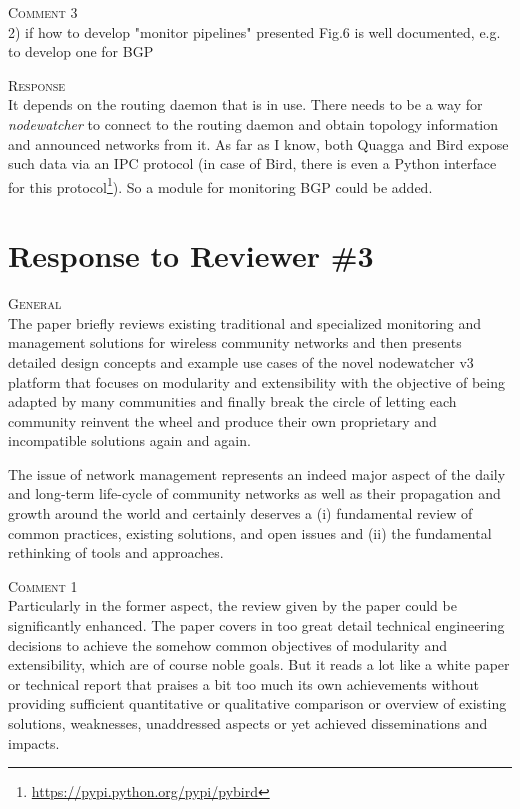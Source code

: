 \documentclass[12pt,twoside,a4paper]{report}
\newcommand{\nodewatcher}{\textit{nodewatcher}}
\begin{document}
\vspace{0.5cm}\noindent\textsc{Comment 3}\\
  2) if how to develop "monitor pipelines" presented Fig.6 is well documented, e.g. to develop one for BGP
  
\vspace{0.5cm}\noindent\textsc{Response}\\
It depends on the routing daemon that is in use.
There needs to be a way for \nodewatcher{} to connect to the routing daemon and obtain topology information and announced networks from it.
As far as I know, both Quagga and Bird expose such data via an IPC protocol (in case of Bird, there is even a Python interface for this protocol\footnote{\url{https://pypi.python.org/pypi/pybird}}).
So a module for monitoring BGP could be added.

\newpage

\section*{Response to Reviewer \#3}

\vspace{0.5cm}\noindent\textsc{General}\\
The paper briefly reviews existing traditional and specialized monitoring and management solutions for wireless community networks and then presents detailed design concepts and example use cases of the novel nodewatcher v3 platform that focuses on modularity and extensibility with the objective of being adapted by many communities and finally break the circle of letting each community reinvent the wheel and produce their own proprietary and incompatible solutions again and again.

The issue of network management represents an indeed major aspect of the daily and long-term life-cycle of community networks as well as their propagation and growth around the world and certainly deserves a (i) fundamental review of common practices, existing solutions, and open issues and (ii) the fundamental rethinking of tools and approaches.

\vspace{0.5cm}\noindent\textsc{Comment 1}\\
Particularly in the former aspect, the review given by the paper could be significantly enhanced. The paper covers in too great detail technical engineering decisions to achieve the somehow common objectives of modularity and extensibility, which are of course noble goals. But it reads a lot like a white paper or technical report that praises a bit too much its own achievements without providing sufficient quantitative or qualitative comparison or overview of existing solutions, weaknesses, unaddressed aspects or yet achieved disseminations and impacts.
\end{document}
